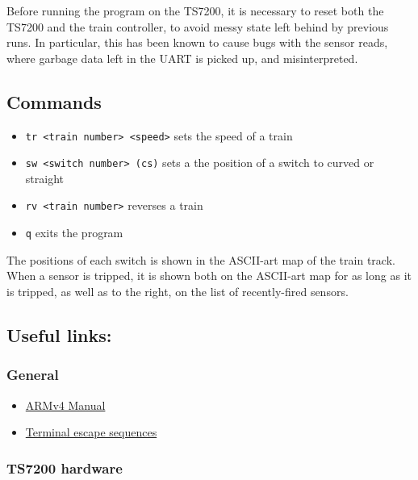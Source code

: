 Before running the program on the TS7200, it is necessary to reset both
the TS7200 and the train controller, to avoid messy state left behind by
previous runs. In particular, this has been known to cause bugs with the
sensor reads, where garbage data left in the UART is picked up, and
misinterpreted.

\subsection{Commands}\label{commands}

\begin{itemize}
\itemsep1pt\parskip0pt
\item
  \texttt{tr \textless{}train number\textgreater{} \textless{}speed\textgreater{}}
  sets the speed of a train
\item
  \texttt{sw \textless{}switch number\textgreater{} (c\textbar{}s)} sets
  a the position of a switch to curved or straight
\item
  \texttt{rv \textless{}train number\textgreater{}} reverses a train
\item
  \texttt{q} exits the program
\end{itemize}

The positions of each switch is shown in the ASCII-art map of the train
track. When a sensor is tripped, it is shown both on the ASCII-art map
for as long as it is tripped, as well as to the right, on the list of
recently-fired sensors.

\subsection{Useful links:}\label{useful-links}

\subsubsection{General}\label{general}

\begin{itemize}
\itemsep1pt\parskip0pt
\item
  \href{http://www.cgl.uwaterloo.ca/~wmcowan/teaching/cs452/pdf/arm-architecture.pdf}{ARMv4
  Manual}
\item
  \href{http://ascii-table.com/ansi-escape-sequences.php}{Terminal
  escape sequences}
\end{itemize}

\subsubsection{TS7200 hardware}\label{ts7200-hardware}

